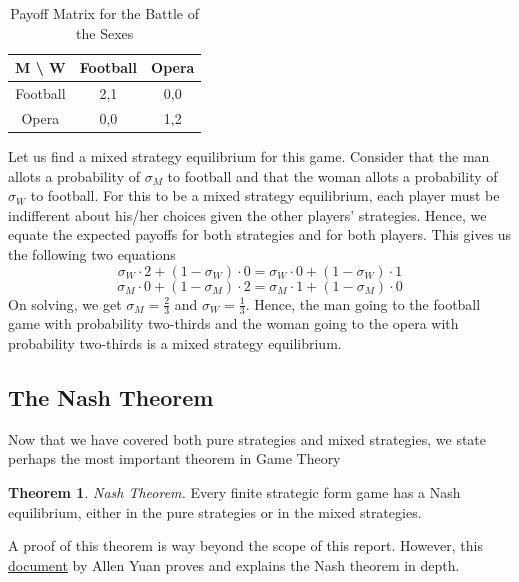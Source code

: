 \documentclass{article}
\theoremstyle{definition}
\newtheorem{theorem}{Theorem}[section]
\begin{document}
\begin{table}[H]
    \begin{adjustbox}{width=5cm,center}
    \begin{tabular}{|c|c|c|}
        \hline
        M \textbackslash \: W & Football & Opera \\
        \hline
        Football & 2,1 & 0,0 \\
        \hline 
        Opera & 0,0 & 1,2  \\
        \hline
    \end{tabular}
    \end{adjustbox}
    \caption{Payoff Matrix for the Battle of the Sexes}
    \label{table:bos}
\end{table}

Let us find a mixed strategy equilibrium for this game. Consider that the man allots a probability of $\sigma_M$ to football and that the woman allots a probability of $\sigma_W$ to football. For this to be a mixed strategy equilibrium, each player must be indifferent about his/her choices given the other players' strategies. Hence, we equate the expected payoffs for both strategies and for both players. This gives us the following two equations 
\[
    \sigma_W \cdot 2 + (1-\sigma_W) \cdot 0 = \sigma_W \cdot 0 +  (1-\sigma_W) \cdot 1
\]
\[
    \sigma_M \cdot 0 + (1- \sigma_M) \cdot 2 = \sigma_M \cdot 1 +  (1-\sigma_M) \cdot 0
\]
On solving, we get $\sigma_M = \frac{2}{3}$ and $\sigma_W = \frac{1}{3}$. Hence, the man going to the football game with probability two-thirds and the woman going to the opera with probability two-thirds is a mixed strategy equilibrium. 

\subsection{The Nash Theorem}

Now that we have covered both pure strategies and mixed strategies, we state perhaps the most important theorem in Game Theory 

\begin{theorem}
\textit{Nash Theorem.} Every finite strategic form game has a Nash equilibrium, either in the pure strategies or in the mixed strategies.
\end{theorem}

A proof of this theorem is way beyond the scope of this report. However, this \href{http://math.uchicago.edu/~may/REU2017/REUPapers/Yuan.pdf}{document} by Allen Yuan proves and explains the Nash theorem in depth.
\end{document}
